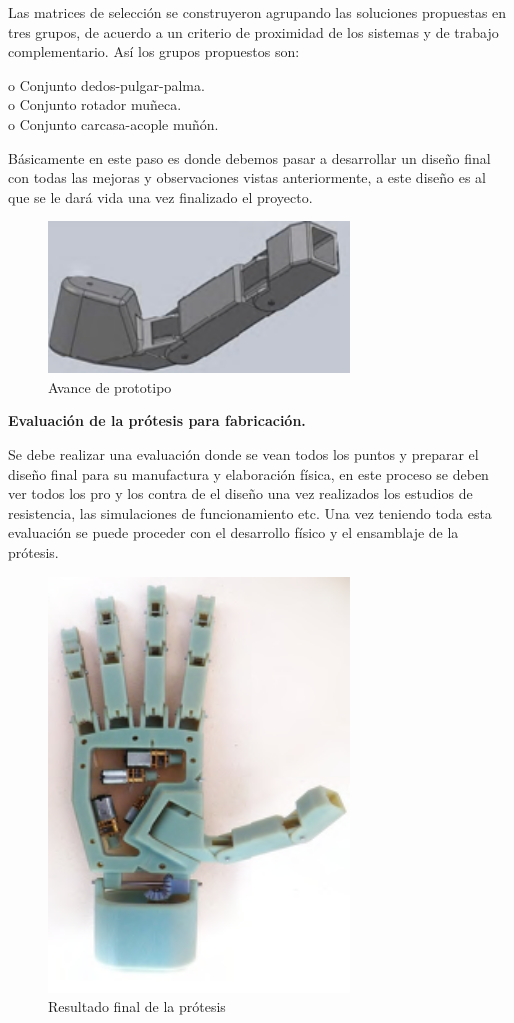 \documentclass{article}
\begin{document}
Las matrices de selección se construyeron agrupando las soluciones propuestas en tres grupos, de acuerdo a un criterio de proximidad de los sistemas y de trabajo complementario.
Así los grupos propuestos son:


o	Conjunto dedos-pulgar-palma.
\\o	Conjunto rotador muñeca.
\\o	Conjunto carcasa-acople muñón.


Básicamente en este paso es donde debemos pasar a desarrollar un diseño final con todas las mejoras y observaciones vistas anteriormente, a este diseño es al que se le dará vida una vez finalizado el proyecto\cite{ff5}.


\begin{figure}[H] %
    \centering
    \includegraphics[width=80mm]{avance de prototipo.png} %
    \caption{Avance de prototipo\cite{ff5}}
    \label{grafica:doce}
\end{figure}

\textbf{Evaluación de la prótesis para fabricación.} 


Se debe realizar una evaluación donde se vean todos los puntos y preparar el diseño final para su manufactura y elaboración física, en este proceso se deben ver todos los pro y los contra de el diseño una vez realizados los estudios de resistencia, las simulaciones de funcionamiento etc.
Una vez teniendo toda esta evaluación se puede proceder con el desarrollo físico y el ensamblaje de la prótesis\cite{ff5}.

\begin{figure}[H] %
    \centering
    \includegraphics[width=80mm]{resultado final de la protesis.png} %
    \caption{Resultado final de la prótesis\cite{ff5}}
    \label{grafica:trece}
\end{figure}
\end{document}
